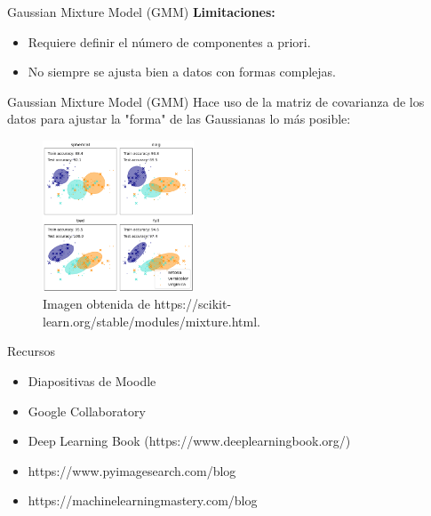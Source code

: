 \begin{frame}{Gaussian Mixture Model (GMM)}
\textbf{Limitaciones:}
\begin{itemize}
    \item Requiere definir el número de componentes a priori.
    \item No siempre se ajusta bien a datos con formas complejas.
\end{itemize}
\end{frame}



\begin{frame}{Gaussian Mixture Model (GMM)}
Hace uso de la matriz de covarianza de los datos para ajustar la "forma" de las Gaussianas lo más posible:

\begin{figure}
    \centering
    \includegraphics[width=0.4\textwidth]{Slides/figures/02_Metodos_Generativos/2.1. gmm cov.png}
    \caption{Imagen obtenida de https://scikit-learn.org/stable/modules/mixture.html.}
\end{figure}
\end{frame}

\fi

\begin{frame}{Recursos}
\begin{itemize}
    \item Diapositivas de Moodle
    \item Google Collaboratory
    \item Deep Learning Book (https://www.deeplearningbook.org/)
    \item https://www.pyimagesearch.com/blog
    \item https://machinelearningmastery.com/blog
\end{itemize}
\end{frame}


\appendix

%     
%     

